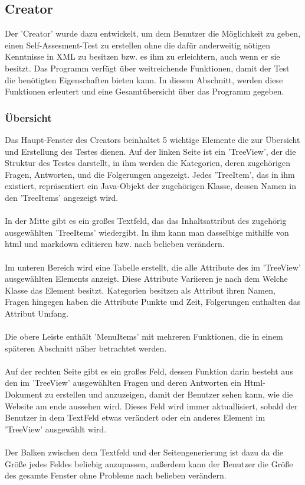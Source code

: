 \label{Julian}
\subsection{Creator}
Der 'Creator' wurde dazu entwickelt, um dem Benutzer die Möglichkeit zu geben, einen Self-Assesment-Test zu erstellen ohne die dafür anderweitig nötigen Kenntnisse in XML zu besitzen bzw. es ihm zu erleichtern, auch wenn er sie besitzt. Das Programm verfügt über weitreichende Funktionen, damit der Test die benötigten Eigenschaften bieten kann. In diesem Abschnitt, werden diese Funktionen erleutert und eine Gesamtübersicht über das Programm gegeben. 

\subsubsection*{Übersicht}
Das Haupt-Fenster des Creators beinhaltet 5 wichtige Elemente die zur Übersicht und Erstellung des Testes dienen. Auf der linken Seite ist ein 'TreeView', der die Struktur des Testes darstellt, in ihm werden die Kategorien, deren zugehörigen Fragen, Antworten, und die Folgerungen angezeigt. Jedes 'TreeItem', das in ihm existiert, repräsentiert ein Java-Objekt der zugehörigen Klasse, dessen Namen in den 'TreeItems' angezeigt wird.
\\
\\
In der Mitte gibt es ein großes Textfeld, das das Inhaltsattribut des zugehörig ausgewählten 'TreeItems' wiedergibt. In ihm kann man dasselbige mithilfe von html und markdown editieren bzw. nach belieben verändern.
\\
\\
Im unteren Bereich wird eine Tabelle erstellt, die alle Attribute des im 'TreeView'  ausgewählten Elements anzeigt. Diese Attribute Variieren je nach dem Welche Klasse das Element besitzt. Kategorien besitzen als Attribut ihren Namen, Fragen hingegen haben die Attribute Punkte und Zeit, Folgerungen enthalten das Attribut Umfang.
\\
\\
Die obere Leiste enthält 'MenuItems' mit mehreren Funktionen, die in einem späteren Abschnitt näher betrachtet werden.
\\
\\
Auf der rechten Seite gibt es ein großes Feld, dessen Funktion darin besteht aus den im 'TreeView' ausgewählten Fragen und deren Antworten ein Html-Dokument zu erstellen und anzuzeigen, damit der Benutzer sehen kann, wie die Website am ende aussehen wird. Dieses Feld wird immer aktuallisiert, sobald der Benutzer in dem TextFeld etwas verändert oder ein anderes Element im 'TreeView' ausgewählt wird.
\\
\\
Der Balken zwischen dem Textfeld und der Seitengenerierung ist dazu da die Größe jedes Feldes beliebig anzupassen, außerdem kann der Benutzer die Größe des gesamte Fenster ohne Probleme nach belieben verändern.

